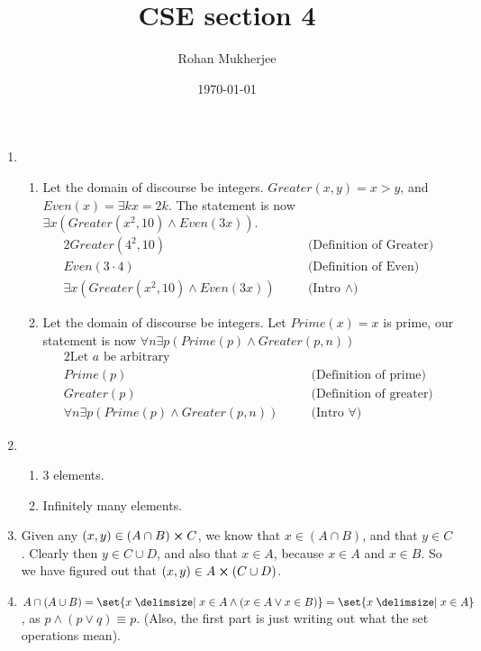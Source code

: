 \documentclass[12pt]{article}
\title{CSE section 4}
\date{\today}
\author{Rohan Mukherjee}
\theoremstyle{definition}
\theoremstyle{remark}
\newcommand\setItemnumber[1]{\setcounter{enumi}{\numexpr#1-1\relax}}
\newcommand{\justif}[1]{&\quad &\text{(#1)}}
\begin{document}
	\maketitle
	\begin{enumerate}[leftmargin=\labelsep]
		\setItemnumber{2}
		\item 
		\begin{enumerate}
			\item Let the domain of discourse be integers. $Greater(x, y) = x > y$, and $Even(x) = \exists k x = 2k$. The statement is now $\exists x (Greater(x^2, 10) \land Even(3x))$.
		\begin{alignat*}{2}
			Greater(4^2, 10) \justif{Definition of Greater} \\
			Even(3\cdot 4) \justif{Definition of  Even} \\
			\exists x (Greater(x^2, 10) \land Even(3x)) \justif{Intro $\land$}
		\end{alignat*}
		\item Let the domain of discourse be integers. Let $Prime(x) = x$ is prime, our statement is now $\forall n \exists p(Prime(p) \land Greater(p, n))$
		\begin{alignat*}{2}
			\text{Let $a$ be arbitrary} \\
			Prime(p) \justif{Definition of prime} \\
			Greater(p) \justif{Definition of greater} \\ 
			\forall n \exists p (Prime(p) \land Greater(p, n)) \justif{Intro $\forall$}
		\end{alignat*}
		\end{enumerate}
		\item 
		\begin{enumerate}
			\item 3 elements.
		\item Infinitely many elements.
		\end{enumerate}
		\item Given any $(x, y) \in (A \cap B)\cross C$, we know that $x \in (A \cap B)$, and that $y \in C$. Clearly then $y \in C \cup D$, and also that $x \in A$, because $x \in A$ and $x \in B$. So we have figured out that $(x, y) \in A \cross (C \cup D)$.
		\item 
		$A \cap (A \cup B) = \set{x \given x \in A \land (x \in A \lor x \in B)} = \set{x \given x \in A}$, as $p \land (p \lor q) \equiv p$. (Also, the first part is just writing out what the set operations mean).
	\end{enumerate}
\end{document}
